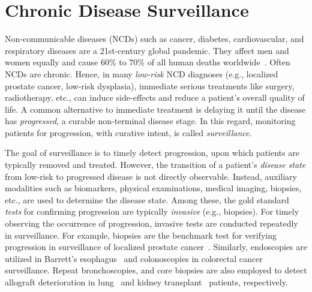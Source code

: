 \section{Chronic Disease Surveillance}
\label{c1:sec:invasive_tests}
Non-communicable diseases (NCDs) such as cancer, diabetes, cardiovascular, and respiratory diseases are a 21st-century global pandemic. They affect men and women equally and cause 60\% to 70\% of all human deaths worldwide~\citep{world2014global, bennett2018ncd}. Often NCDs are chronic. Hence, in many \emph{low-risk} NCD diagnoses (e.g., localized prostate cancer, low-risk dysplasia), immediate serious treatments like surgery, radiotherapy, etc., can induce side-effects and reduce a patient's overall quality of life. A common alternative to immediate treatment is delaying it until the disease has \emph{progressed}, a curable non-terminal disease stage. In this regard, monitoring patients for progression, with curative intent, is called \emph{surveillance}. 

The goal of surveillance is to timely detect progression, upon which patients are typically removed and treated. However, the transition of a patient's \emph{disease state} from low-risk to progressed disease is not directly observable. Instead, auxiliary modalities such as biomarkers, physical examinations, medical imaging, biopsies, etc., are used to determine the disease state. Among these, the gold standard \emph{tests} for confirming progression are typically \emph{invasive} (e.g., biopsies). For timely observing the occurrence of progression, invasive tests are conducted repeatedly in surveillance. For example, biopsies are the benchmark test for verifying progression in surveillance of localized prostate cancer~\citep{bokhorst2015compliance}. Similarly, endoscopies are utilized in Barrett's esophagus~\citep{choi2012screening} and colonoscopies in colorectal cancer~\citep{krist2007timing} surveillance. Repeat bronchoscopies, and core biopsies are also employed to detect allograft deterioration in lung~\citep{mcwilliams2008surveillance} and kidney transplant~\citep{henderson2011surveillance} patients, respectively.

